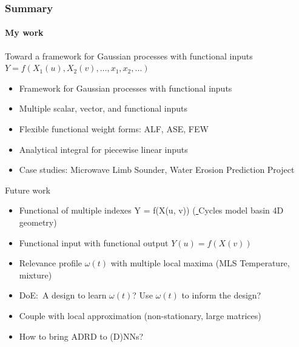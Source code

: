 \documentclass{snedecorbeamer}
\begin{document}
\begin{frame}
  \frametitle{Summary}
  \framesubtitle{My work}

  Toward a framework for Gaussian processes with functional inputs
  $Y = f(X_1(u), X_2(v), \dots, x_1, x_2, \dots)$
  \begin{itemize}
    \footnotesize
  \item Framework for Gaussian processes with functional inputs
  \item Multiple scalar, vector, and functional inputs
  \item Flexible functional weight forms: ALF, ASE, FEW
  \item \hyperlink{frm:validation}{}
    Analytical integral for piecewise linear inputs
  \item Case studies: Microwave Limb Sounder, Water Erosion Prediction Project
  \end{itemize}
  \vspace{3ex}

  Future work
  \begin{itemize}
    \footnotesize
  \item Functional of multiple indexes Y = f(X(u, v))
    (\href{https://psumodeling.github.io/Cycles/}{
      }
    Cycles model basin 4D geometry)
  \item Functional input with functional output $Y(u) = f(X(v))$
  \item Relevance profile $\omega(t)$ with multiple local maxima (MLS
    Temperature, mixture)
  \item DoE:~A design to learn $\omega(t)$? Use $\omega(t)$ to inform the
    design?
  \item Couple with local approximation (non-stationary, large matrices)
  \item How to bring ADRD to (D)NNs?
  \end{itemize}
\end{frame}
\end{document}

